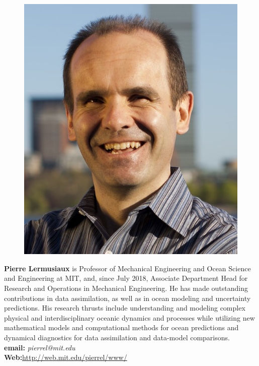 \documentclass[12pt]{article}
\begin{document}
\parbox{6.5in}{
\begin{figure}
  \centering
  \includegraphics[width=.75\linewidth]{fig/Pierre.jpg}
\end{figure}
\textbf{Pierre Lermusiaux} is Professor of Mechanical Engineering and
Ocean Science and Engineering at MIT, and, since July 2018, Associate
Department Head for Research and Operations in Mechanical
Engineering. He has made outstanding contributions in data
assimilation, as well as in ocean modeling and uncertainty
predictions. His research thrusts include understanding and modeling
complex physical and interdisciplinary oceanic dynamics and processes
while utilizing new mathematical models and computational methods for
ocean predictions and dynamical diagnostics for data assimilation
and data-model comparisons.
\\
\textbf{email: }\emph{pierrel@mit.edu}\\
\textbf{Web:}\url{http://web.mit.edu/pierrel/www/} 
}
\end{document}
